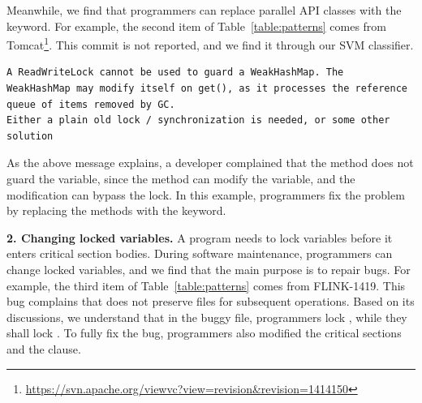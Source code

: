 

Meanwhile, we find that programmers can replace parallel API classes with the  keyword. For example, the second item of Table~\ref{table:patterns} comes from Tomcat\footnote{\url{https://svn.apache.org/viewvc?view=revision&revision=1414150}}. This commit is not reported, and we find it through our SVM classifier.%

\begin{lstlisting}
A ReadWriteLock cannot be used to guard a WeakHashMap. The
WeakHashMap may modify itself on get(), as it processes the reference
queue of items removed by GC.
Either a plain old lock / synchronization is needed, or some other solution
\end{lstlisting}

As the above message explains, a developer complained that the  method does not guard the  variable, since the  method can modify the  variable, and the modification can bypass the lock. In this example, programmers fix the problem by replacing the methods with the  keyword.%


\noindent
\textbf{2. Changing locked variables.} A program needs to lock variables before it enters critical section bodies. During software maintenance, programmers can change locked variables, and we find that the main purpose is to repair bugs. For example, the third item of Table~\ref{table:patterns} comes from FLINK-1419. This bug complains that  does not preserve files for subsequent operations. Based on its discussions, we understand that in the buggy file, programmers lock , while they shall lock . To fully fix the bug, programmers also modified the critical sections and the  clause.

